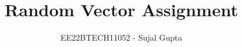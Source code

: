 \documentclass[journal,12pt,onecolumn]{IEEEtran}
\theoremstyle{remark}
\begin{document}
%




\vspace{3cm}

\title{
Random Vector Assignment
}
\author{ EE22BTECH11052 - Sujal Gupta%
	
}	


%
%
%

% 
%
\end{document}
